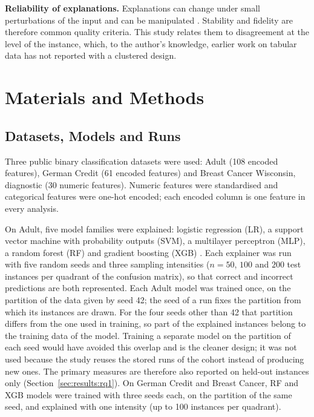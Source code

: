 \textbf{Reliability of explanations.} Explanations can change under small perturbations
of the input \cite{alvarezmelis2018robustness} and can be manipulated
\cite{slack2020fooling}. Stability and fidelity are therefore common quality criteria.
This study relates them to disagreement at the level of the instance, which, to the author's knowledge, earlier work on tabular data has not reported with a
clustered design.

\section{Materials and Methods}
\label{sec:methods}

\subsection{Datasets, Models and Runs}

Three public binary classification datasets were used: Adult \cite{becker1996adult}
(108 encoded features), German Credit \cite{hofmann1994statlog} (61 encoded features) and
Breast Cancer Wisconsin, diagnostic \cite{wolberg1993breast} (30 numeric features).
Numeric features were standardised and categorical features were one-hot encoded; each
encoded column is one feature in every analysis.

On Adult, five model families were explained: logistic regression (LR), a support
vector machine with probability outputs (SVM), a multilayer perceptron (MLP), a random
forest (RF) \cite{breiman2001random} and gradient boosting (XGB) \cite{chen2016xgboost}.
Each explainer was run with five random seeds and three sampling intensities
($n = 50$, $100$ and $200$ test instances per quadrant of the confusion matrix), so that
correct and incorrect predictions are both represented. Each Adult model was trained once, on the partition of the data given by seed 42; the
seed of a run fixes the partition from which its instances are drawn. For the four seeds
other than 42 that partition differs from the one used in training, so part of the
explained instances belong to the training data of the model. Training a separate model on
the partition of each seed would have avoided this overlap and is the cleaner design; it was
not used because the study reuses the stored runs of the cohort instead of producing new
ones. The primary measures are therefore also reported on held-out instances only
(Section~\ref{sec:results:rq1}). On German Credit and Breast
Cancer, RF and XGB models were trained with three seeds each, on the partition of the same
seed, and explained with one intensity (up to 100 instances per quadrant).

